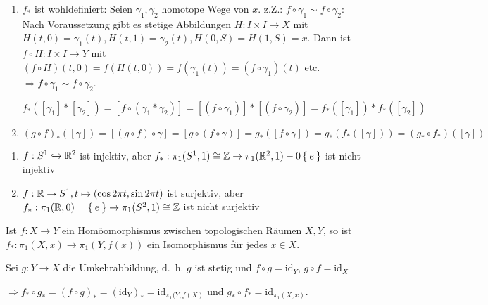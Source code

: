 \begin{beweis}
    \begin{enumerate}[label=\alph*)]
        \item $f_*$ ist wohldefiniert: Seien $\gamma_1, \gamma_2$ homotope
              Wege von $x$. z.Z.: $f \circ \gamma_1 \sim f \circ \gamma_2$:
              Nach Voraussetzung gibt es stetige Abbildungen $H:I\times I \rightarrow X$
              mit $H(t,0) = \gamma_1(t), H(t,1) = \gamma_2(t), H(0,S) = H(1, S) = x$.
              Dann ist $f \circ H: I \times I \rightarrow Y$ mit
               $(f \circ H)(t,0) = f(H(t,0)) = f(\gamma_1(t)) = (f \circ \gamma_1)(t)$
              etc. $\Rightarrow f \circ \gamma_1 \sim f \circ \gamma_2$.

              $f_*([\gamma_1] * [\gamma_2]) = [f \circ (\gamma_1 * \gamma_2)] = [(f \circ \gamma_1)] * [(f \circ \gamma_2)] = f_*([\gamma_1]) * f_*([\gamma_2])$
        \item $(g \circ f)_* ([\gamma]) = [(g \circ f) \circ \gamma] = [g \circ (f \circ \gamma)] = g_* ([f \circ \gamma]) = g_* (f_* ([\gamma])) = (g_* \circ f_*)([\gamma])$
    \end{enumerate}
\end{beweis}

\begin{beispiel}
    \begin{enumerate}[label=\arabic*)]
        \item $f:S^1 \hookrightarrow \mathbb{R}^2$ ist injektiv, aber 
              $f_*:\pi_1(S^1, 1) \cong \mathbb{Z} \rightarrow \pi_1(\mathbb{R}^2, 1) -0 \Set{e}$
              ist nicht injektiv
        \item $f: \mathbb{R} \rightarrow S^1, t \mapsto (\cos 2 \pi t, \sin 2 \pi t)$
              ist surjektiv, aber $f_*: \pi_1(\mathbb{R}, 0) = \Set{e} \rightarrow \pi_1(S^2, 1) \cong \mathbb{Z}$
              ist nicht surjektiv
    \end{enumerate}
\end{beispiel}

\begin{korollar}%
    Ist $f:X \rightarrow Y$ ein Homöomorphismus zwischen topologischen
    Räumen $X, Y$, so ist $f_*: \pi_1(X,x) \rightarrow \pi_1(Y, f(x))$
    ein Isomorphismus für jedes $x \in X$.
\end{korollar}

\begin{beweis}
    Sei $g: Y \rightarrow X$ die Umkehrabbildung, d.~h. $g$ ist stetig
    und $f \circ g = \text{id}_Y$, $g \circ f = \text{id}_X$

    $\Rightarrow f_* \circ g_* = (f \circ g)_* = (\text{id}_Y)_* = \text{id}_{\pi_1 (Y, f(X)}$
    und $g_* \circ f_* = \text{id}_{\pi_1(X,x)}$.
\end{beweis}

